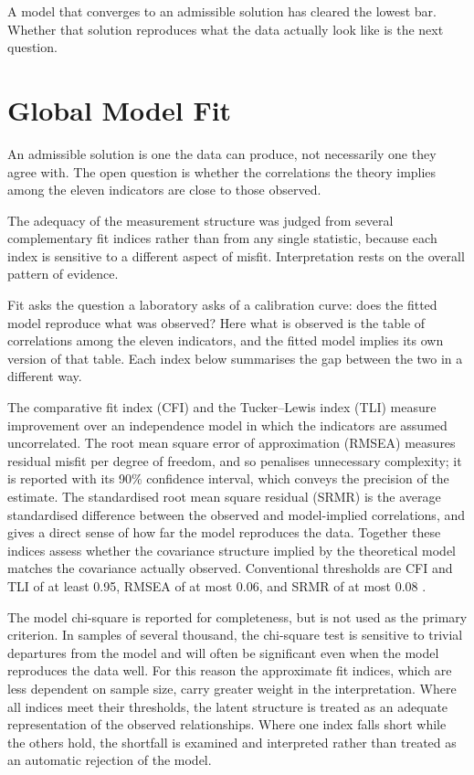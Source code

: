 A model that converges to an admissible solution has cleared the lowest bar. Whether that solution reproduces what the data actually look like is the next question.

\section{Global Model Fit}
\label{sec:anal-fit}
An admissible solution is one the data can produce, not necessarily one they agree with. The open question is whether the correlations the theory implies among the eleven indicators are close to those observed.

The adequacy of the measurement structure was judged from several complementary fit indices rather than from any single statistic, because each index is sensitive to a different aspect of misfit. Interpretation rests on the overall pattern of evidence.

Fit asks the question a laboratory asks of a calibration curve: does the fitted model reproduce what was observed? Here what is observed is the table of correlations among the eleven indicators, and the fitted model implies its own version of that table. Each index below summarises the gap between the two in a different way.

The comparative fit index (CFI) and the Tucker--Lewis index (TLI) measure improvement over an independence model in which the indicators are assumed uncorrelated. The root mean square error of approximation (RMSEA) measures residual misfit per degree of freedom, and so penalises unnecessary complexity; it is reported with its 90\% confidence interval, which conveys the precision of the estimate. The standardised root mean square residual (SRMR) is the average standardised difference between the observed and model-implied correlations, and gives a direct sense of how far the model reproduces the data. Together these indices assess whether the covariance structure implied by the theoretical model matches the covariance actually observed. Conventional thresholds are CFI and TLI of at least 0.95, RMSEA of at most 0.06, and SRMR of at most 0.08 \citep{hu_bentler_1999}.

The model chi-square is reported for completeness, but is not used as the primary criterion. In samples of several thousand, the chi-square test is sensitive to trivial departures from the model and will often be significant even when the model reproduces the data well. For this reason the approximate fit indices, which are less dependent on sample size, carry greater weight in the interpretation. Where all indices meet their thresholds, the latent structure is treated as an adequate representation of the observed relationships. Where one index falls short while the others hold, the shortfall is examined and interpreted rather than treated as an automatic rejection of the model.

